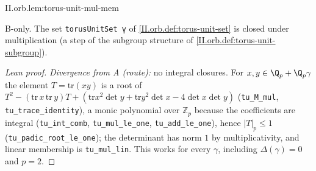 \begin{lemma}
\bonly
{}
\end{lemma}
\begin{tfformal}{II.orb.lem:torus-unit-mul-mem}
\begin{tffidelity}
B-only. The set \texttt{torusUnitSet γ} of \cref{II.orb.def:torus-unit-set} is closed under multiplication (a step of the subgroup structure of \cref{II.orb.def:torus-unit-subgroup}).
\end{tffidelity}
\end{tfformal}
\begin{proof}[Lean proof]
\emph{Divergence from A (route):} no integral closures. For $x,y\in\Q_p+\Q_p\gamma$ the element $T=\mathrm{tr}(xy)$ is a root of $T^2-(\mathrm{tr}\,x\,\mathrm{tr}\,y)T+(\mathrm{tr}x^2\det y+\mathrm{tr}y^2\det x-4\det x\det y)$ (\texttt{tu\_M\_mul}, \texttt{tu\_trace\_identity}), a monic polynomial over $\mathbb Z_p$ because the coefficients are integral (\texttt{tu\_int\_comb}, \texttt{tu\_mul\_le\_one}, \texttt{tu\_add\_le\_one}), hence $|T|_p\le1$ (\texttt{tu\_padic\_root\_le\_one}); the determinant has norm $1$ by multiplicativity, and linear membership is \texttt{tu\_mul\_lin}. This works for every $\gamma$, including $\Delta(\gamma)=0$ and $p=2$.
\end{proof}


